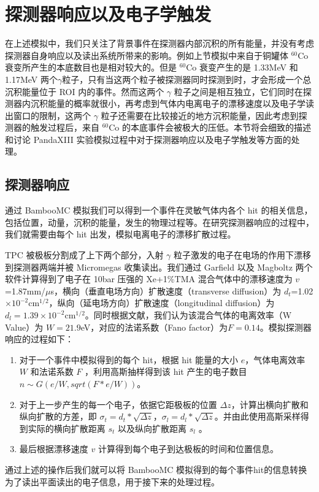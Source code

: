 \section{探测器响应以及电子学触发}

在上述模拟中，我们只关注了背景事件在探测器内部沉积的所有能量，并没有考虑探测器自身响应以及读出系统所带来的影响。例如上节模拟中来自于铜罐体 $^{60}$Co 衰变所产生的本底数目也是相对较大的。但是 $^{60}$Co 衰变产生的是 1.33MeV 和 1.17MeV 两个$\gamma$粒子，只有当这两个粒子被探测器同时探测到时，才会形成一个总沉积能量位于 ROI 内的事件。然而这两个 $\gamma$ 粒子之间是相互独立，它们同时在探测器内沉积能量的概率就很小，再考虑到气体内电离电子的漂移速度以及电子学读出窗口的限制，这两个 $\gamma$ 粒子还需要在比较接近的地方沉积能量，因此考虑到探测器的触发过程后，来自 $^{60}$Co 的本底事件会被极大的压低。本节将会细致的描述和讨论 PandaXIII 实验模拟过程中对于探测器响应以及电子学触发等方面的处理。

\subsection{探测器响应}

通过 BambooMC 模拟我们可以得到一个事件在灵敏气体内各个 hit 的相关信息，包括位置，动量，沉积的能量，发生的物理过程等。在研究探测器响应的过程中，我们就需要由每个 hit 出发，模拟电离电子的漂移扩散过程。

TPC 被极板分割成了上下两个部分，入射 $\gamma$ 粒子激发的电子在电场的作用下漂移到探测器两端并被 Micromegas 收集读出。我们通过 Garfield\supercite{garfield} 以及 Magboltz\supercite{magboltz} 两个软件计算得到了电子在 10bar 压强的 Xe+1\%TMA 混合气体中的漂移速度为 $v$=1.87mm/$\mu$s，横向（垂直电场方向）扩散速度（transverse diffusion）为 $d_{t}$=1.02$\times 10^{-2}$cm$^{1/2}$，纵向（延电场方向）扩散速度（longitudinal diffusion）为$d _{l}=1.39\times 10^{-2}$cm$^{1/2}$。同时根据文献\cite{Aprile:2009dv}，我们认为该混合气体的电离效率（W Value）为 $W=21.9$eV，对应的法诺系数（Fano factor）为$F=0.14$。模拟探测器响应的过程如下：
\begin{enumerate}
    \item 对于一个事件中模拟得到的每个 hit，根据 hit 能量的大小 $e$，气体电离效率 $W$ 和法诺系数 $F$ ，利用高斯抽样得到该 hit 产生的电子数目 $n \sim G(e/W, sqrt(F*e/W))$。
    \item 对于上一步产生的每一个电子，依据它距极板的位置 $\Delta z$，计算出横向扩散和纵向扩散的方差，即 $\sigma_{t}=d_t*\sqrt{\Delta z}$，$\sigma_{l}=d_l*\sqrt{\Delta z}$。并由此使用高斯采样得到实际的横向扩散距离 $s_t$ 以及纵向扩散距离 $s_l$ 。
    \item 最后根据漂移速度 $v$ 计算得到每个电子到达极板的时间和位置信息。
\end{enumerate}
通过上述的操作后我们就可以将 BambooMC 模拟得到的每个事件hit的信息转换为了读出平面读出的电子信息，用于接下来的处理过程。


